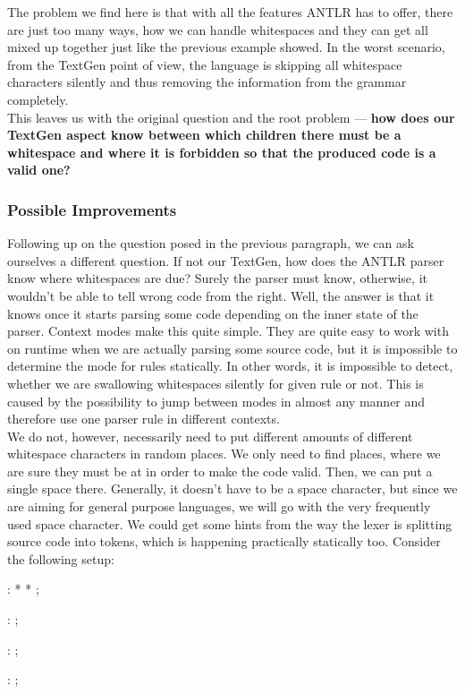 The problem we find here is that with all the features ANTLR has to offer, there are just too many ways, how we can handle whitespaces and they can get all mixed up together just like the previous example showed.
In the worst scenario, from the TextGen point of view, the language is skipping all whitespace characters silently and thus removing the information from the grammar completely.
\\

This leaves us with the original question and the root problem --- \textbf{how does our TextGen aspect know between which children there must be a whitespace and where it is forbidden so that the produced code is a valid one?}

\subsubsection{Possible Improvements}

Following up on the question posed in the previous paragraph, we can ask ourselves a different question.
If not our TextGen, how does the ANTLR parser know where whitespaces are due?
Surely the parser must know, otherwise, it wouldn't be able to tell wrong code from the right.
Well, the answer is that it knows once it starts parsing some code depending on the inner state of the parser.
Context modes make this quite simple.
They are quite easy to work with on runtime when we are actually parsing some source code, but it is impossible to determine the mode for rules statically.
In other words, it is impossible to detect, whether we are swallowing whitespaces silently for given rule or not.
This is caused by the possibility to jump between modes in almost any manner and therefore use one parser rule in different contexts.
\\

We do not, however, necessarily need to put different amounts of different whitespace characters in random places.
We only need to find places, where we are sure they must be at in order to make the code valid.
Then, we can put a single space there.
Generally, it doesn't have to be a space character, but since we are aiming for general purpose languages, we will go with the very frequently used space character.
We could get some hints from the way the lexer is splitting source code into tokens, which is happening practically statically too.
Consider the following setup:

\begin{antlr}
	    :   \literal{<}  * \literal{>} * \literal{</}  \literal{>} ;

	  :       ;

	       :    ;

	       :   \regex{~[<"]*} ;
\end{antlr}


